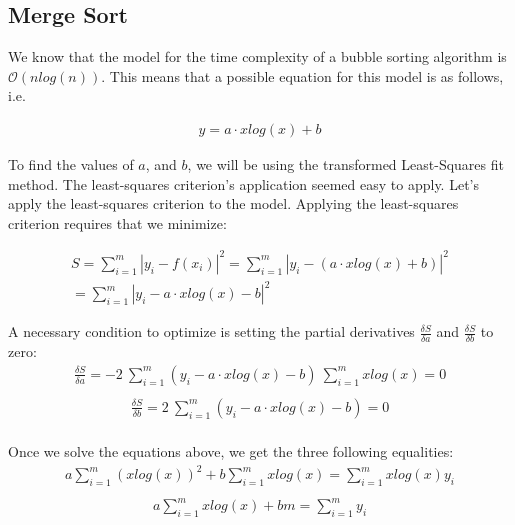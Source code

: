 \documentclass[]{report}
\begin{document}
		 		\subsection{Merge Sort}
		 		
		 		We know that the model for the time complexity of a bubble sorting algorithm is $\mathcal{O}(n log(n))$. This means that a possible equation for this model is as follows, i.e.
		 		\begin{ceqn}
					\begin{align}
		 				y = a \cdot x log(x) + b
					\end{align}
				\end{ceqn}
		 		To find the values of $a$, and $b$, we will be using the transformed Least-Squares fit method. The least-squares criterion's application seemed easy to apply. Let's apply the least-squares criterion to the model. Applying the least-squares criterion requires that we minimize:
		 		\begin{ceqn}
					\begin{align}
		 				S = \sum_{i=1}^{m}|y_i - f(x_i)|^2 = \sum_{i=1}^{m}|y_i - (a \cdot x log(x) + b)|^2 \\
		 				= \sum_{i=1}^{m}|y_i - a \cdot x log(x) - b|^2
					\end{align}
				\end{ceqn}
				A necessary condition to optimize is setting the partial derivatives $\frac{\delta S}{\delta a}$ and $\frac{\delta S}{\delta b}$ to zero:
				\begin{equation}
					\begin{align}
		 				\frac{\delta S}{\delta a} = -2 \ \sum_{i=1}^{m}(y_i - a \cdot x log(x) - b) \ \sum_{i=1}^{m}x log(x) = 0\\
					\end{align}
				\end{equation}
				\begin{equation}
					\begin{align}
		 				\frac{\delta S}{\delta b} = 2 \ \sum_{i=1}^{m}(y_i - a \cdot x log(x) - b) = 0\\
					\end{align}
				\end{equation}
				
				Once we solve the equations above, we get the three following equalities:
				\begin{equation}
					\begin{align}
		 				 a\sum_{i=1}^{m}(x log(x))^2 + b\sum_{i=1}^{m}x log(x) = \sum_{i=1}^{m}x log(x)y_i\\
					\end{align}
				\end{equation}
				\begin{equation}
					\begin{align}
		 				 a\sum_{i=1}^{m}x log(x) + bm = \sum_{i=1}^{m}y_i\\
					\end{align}
				\end{equation}
\end{document}
